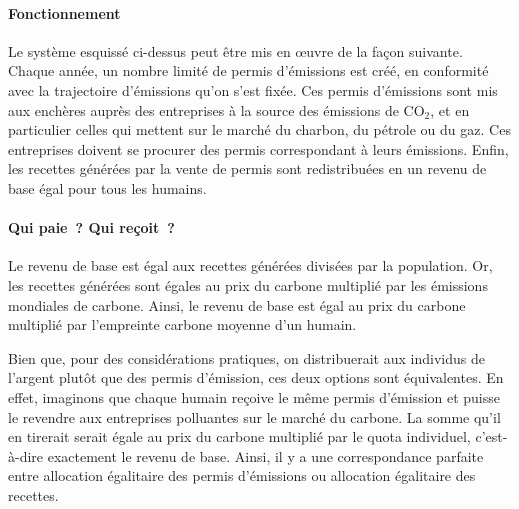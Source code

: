 \documentclass[a5paper,french,openany]{memoir}
\begin{document}
\paragraph{Fonctionnement}
Le système esquissé ci-dessus peut être mis en œuvre de la façon suivante. Chaque année, un nombre limité de permis d'émissions est créé, en conformité avec la trajectoire d'émissions qu'on s'est fixée. Ces permis d'émissions sont mis aux enchères auprès des entreprises à la source des émissions de CO$_\text{2}$, et en particulier celles qui mettent sur le marché %
du charbon, du pétrole ou du gaz. Ces entreprises doivent se procurer des permis correspondant à leurs émissions. Enfin, les recettes générées par la vente de permis sont redistribuées en un revenu de base égal pour tous les humains. 

\paragraph{Qui paie~? Qui reçoit~?}
Le revenu de base est égal aux recettes générées divisées par la population. Or, les recettes générées sont égales au prix du carbone multiplié par les émissions mondiales de carbone. Ainsi, le revenu de base est égal au prix du carbone multiplié par l'empreinte carbone moyenne d'un humain. 

Bien que, pour des considérations pratiques, on distribuerait aux individus de l'argent plutôt que des permis d'émission, ces deux options sont équivalentes. En effet, imaginons que chaque humain reçoive le même permis d'émission et puisse le revendre aux entreprises polluantes sur le marché du carbone. La somme qu'il en tirerait serait égale au prix du carbone multiplié par le quota individuel, c'est-à-dire exactement le revenu de base. Ainsi, il y a une correspondance parfaite entre allocation égalitaire des permis d'émissions ou allocation égalitaire des recettes. %
\end{document}
